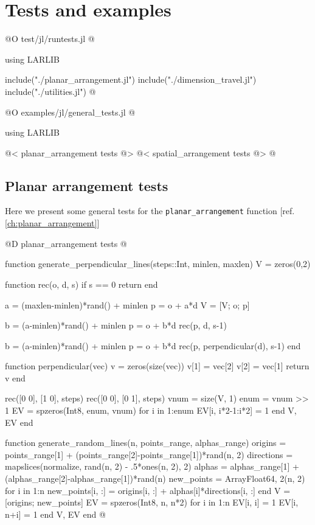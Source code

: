 \chapter{Tests and examples}

@O test/jl/runtests.jl
@{using LARLIB

include("./planar_arrangement.jl")
include("./dimension_travel.jl")
include("./utilities.jl")
@}

@O examples/jl/general_tests.jl
@{using LARLIB

@< planar\_arrangement tests @>
@< spatial\_arrangement tests @>
@}

\section{Planar arrangement tests}
\label{ch:planar_arrangement_tests}

Here we present some general tests for the \texttt{planar\_arrangement} function [ref. \ref{ch:planar_arrangement}]

@D planar\_arrangement tests
@{function generate_perpendicular_lines(steps::Int, minlen, maxlen)
    V = zeros(0,2)

    function rec(o, d, s)
        if s == 0 return end

        a = (maxlen-minlen)*rand() + minlen
        p = o + a*d
        V = [V; o; p]

        b = (a-minlen)*rand() + minlen
        p = o + b*d
        rec(p, d, s-1)

        b = (a-minlen)*rand() + minlen
        p = o + b*d
        rec(p, perpendicular(d), s-1)
    end

    function perpendicular(vec)
        v = zeros(size(vec))
        v[1] = vec[2]
        v[2] = vec[1]
        return v
    end

    rec([0 0], [1 0], steps)
    rec([0 0], [0 1], steps)
    vnum = size(V, 1)
    enum = vnum >> 1
    EV = spzeros(Int8, enum, vnum)
    for i in 1:enum
        EV[i, i*2-1:i*2] = 1
    end
    V, EV
end


function generate_random_lines(n, points_range, alphas_range)
    origins = points_range[1] + (points_range[2]-points_range[1])*rand(n, 2)
    directions = mapslices(normalize, rand(n, 2) - .5*ones(n, 2), 2)
    alphas = alphas_range[1] + (alphas_range[2]-alphas_range[1])*rand(n)
    new_points = Array{Float64, 2}(n, 2)
    for i in 1:n
        new_points[i, :] = origins[i, :] + alphas[i]*directions[i, :]
    end
    V = [origins; new_points]
    EV = spzeros(Int8, n, n*2)
    for i in 1:n
        EV[i, i] = 1
        EV[i, n+i] = 1
    end
    V, EV
end
@}

